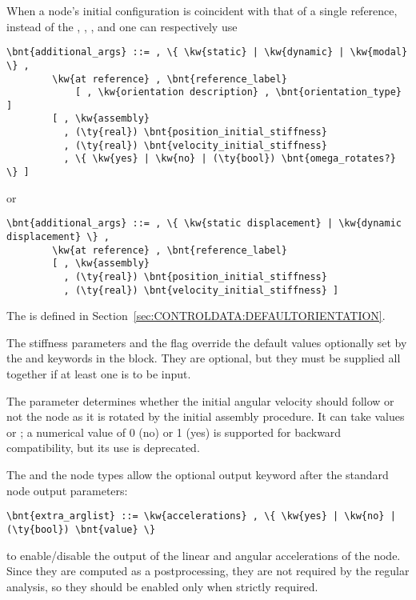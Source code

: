 When a node's initial configuration is coincident with that of a single reference, instead of the , , , and  one can respectively use
\begin{Verbatim}[commandchars=\\\{\}]
    \bnt{additional_args} ::= , \{ \kw{static} | \kw{dynamic} | \kw{modal} \} ,
        \kw{at reference} , \bnt{reference_label}
            [ , \kw{orientation description} , \bnt{orientation_type} ]
        [ , \kw{assembly}
          , (\ty{real}) \bnt{position_initial_stiffness}
          , (\ty{real}) \bnt{velocity_initial_stiffness}
          , \{ \kw{yes} | \kw{no} | (\ty{bool}) \bnt{omega_rotates?} \} ]
\end{Verbatim}
or
\begin{Verbatim}[commandchars=\\\{\}]
    \bnt{additional_args} ::= , \{ \kw{static displacement} | \kw{dynamic displacement} \} ,
        \kw{at reference} , \bnt{reference_label}
        [ , \kw{assembly}
          , (\ty{real}) \bnt{position_initial_stiffness}
          , (\ty{real}) \bnt{velocity_initial_stiffness} ]
\end{Verbatim}
The  is defined
in Section~\ref{sec:CONTROLDATA:DEFAULTORIENTATION}.


The stiffness parameters and the  flag
override the default values optionally set by the 
and  keywords in the  block. 
They are optional, but they must be supplied all together if at least
one is to be input.

The  parameter determines whether 
the initial angular velocity should follow or not the node 
as it is rotated by the initial assembly procedure.
It can take values  or ;
a numerical value of 0 (no) or 1 (yes) is supported for backward
compatibility, but its use is deprecated.

The  and the  node types allow
the optional output keyword
 after the standard node output parameters:
\begin{Verbatim}[commandchars=\\\{\}]
    \bnt{extra_arglist} ::= \kw{accelerations} , \{ \kw{yes} | \kw{no} | (\ty{bool}) \bnt{value} \}
\end{Verbatim}
to enable/disable the output of the linear and angular accelerations
of the node.  Since they are computed as a postprocessing, they are not required
by the regular analysis, so they should be enabled only when strictly required.


